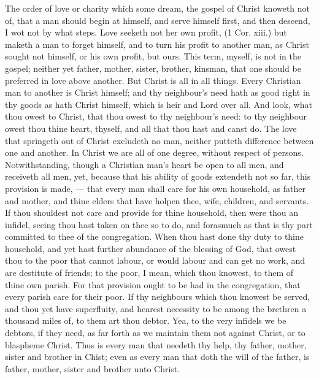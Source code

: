 The order of love or charity which some dream, the
gospel of Christ knoweth not of, that a man should begin
at himself, and serve himself first, and then descend, I wot 
not by what steps. Love seeketh not her own profit, (1 Cor. 
xiii.) but maketh a man to forget himself, and to turn his 
profit to another man, as Christ sought not himself, or his 
own profit, but ours. This term, myself, is not in the 
gospel; neither yet father, mother, sister, brother, kinsman,
that one should be preferred in love above another. 
But Christ is all in all things. Every Christian man to 
another is Christ himself; and thy neighbour's need hath 
as good right in thy goods as hath Christ himself, which is 
heir and Lord over all. And look, what thou owest to 
Christ, that thou owest to thy neighbour's need: to thy 
neighbour owest thou thine heart, thyself, and all that thou 
hast and canst do. The love that springeth out of Christ 
excludeth no man, neither putteth difference between one 
and another. In Christ we are all of one degree, without 
respect of persons. Notwithstanding, though a Christian 
man's heart be open to all men, and receiveth all men, yet, 
because that his ability of goods extendeth not so far, this 
provision is made, — that every man shall care for his own 
household, as father and mother, and thine elders that have 
holpen thee, wife, children, and servants. If thou shouldest 
not care and provide for thine household, then were thou 
an infidel, seeing thou hast taken on thee so to do, 
and forasmuch as that is thy part committed to thee of the 
congregation. When thou hast done thy duty to thine 
household, and yet hast further abundance of the blessing 
of God, that owest thou to the poor that cannot labour, 
or would labour and can get no work, and are destitute of 
friends; to the poor, I mean, which thou knowest, to them 
of thine own parish. For that provision ought to be had 
in the congregation, that every parish care for their poor. 
If thy neighbours which thou knowest be served, and thou 
yet have superfluity, and hearest necessity to be among the 
brethren a thousand miles of, to them art thou debtor. 
Yea, to the very infidels we be debtors, if they need, as 
far forth as we maintain them not against Christ, or to 
blaspheme Christ. Thus is every man that needeth thy 
help, thy father, mother, sister and brother in Chist; even 
as every man that doth the will of the father, is father, 
mother, sister and brother unto Christ. 

